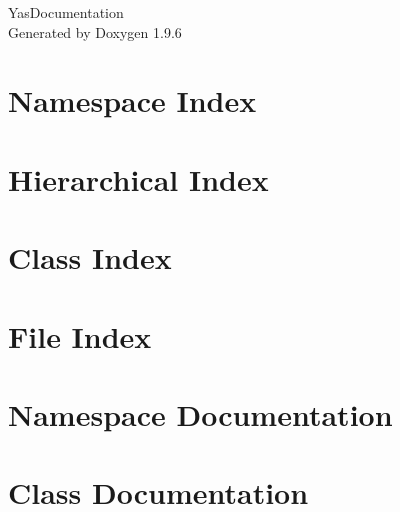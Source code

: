 \documentclass[twoside]{book}
\newcommand{\+}{\discretionary{\mbox{\scriptsize$\hookleftarrow$}}{}{}}
\newcommand{\clearemptydoublepage}{%
    \newpage{\pagestyle{empty}\cleardoublepage}%
  }
\begin{document}
  \raggedbottom
    \hypersetup{pageanchor=false,
                bookmarksnumbered=true,
                pdfencoding=unicode
               }
  \begin{titlepage}
  \vspace*{7cm}
  \begin{center}%
  {\Large Yas\+Documentation}\\
  \vspace*{1cm}
  {\large Generated by Doxygen 1.9.6}\\
  \end{center}
  \end{titlepage}
  \clearemptydoublepage
  \tableofcontents
  \clearemptydoublepage
  \hypersetup{pageanchor=true}
\chapter{Namespace Index}

\chapter{Hierarchical Index}

\chapter{Class Index}

\chapter{File Index}

\chapter{Namespace Documentation}

\chapter{Class Documentation}























\end{document}
